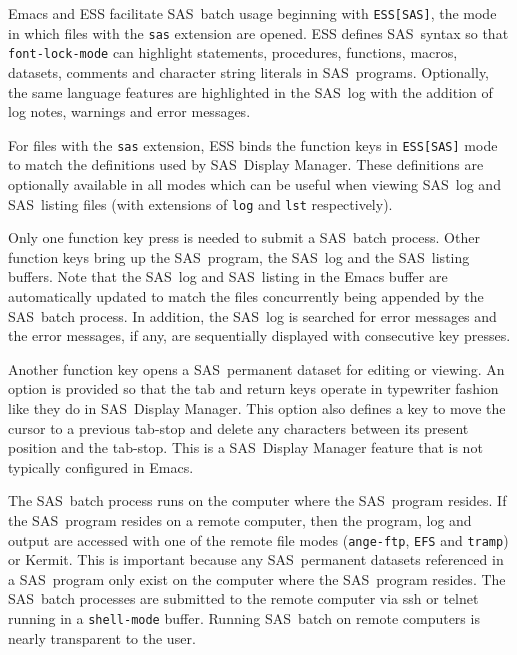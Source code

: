 \documentclass{article}
\newcommand*{\SAS}{\textsc{SAS}}
\newcommand{\stexttt}[1]{{\small\texttt{#1}}}
\newenvironment{Comment}{\begin{quote}\small\itshape }{\end{quote}}
\begin{document}
Emacs and ESS facilitate \SAS\ batch usage beginning with
\stexttt{ESS[SAS]}, the mode in which files with the \stexttt{sas}
extension are opened.  ESS defines \SAS\ syntax so that
\stexttt{font-lock-mode} can highlight statements, procedures,
functions, macros, datasets, comments and character string literals in
\SAS\ programs.  Optionally, the same language features are
highlighted in the \SAS\ log with the addition of log notes, warnings
and error messages.

For files with the \stexttt{sas} extension, ESS binds the function
keys in \stexttt{ESS[SAS]} mode to match the definitions used by \SAS\ 
Display Manager.  These definitions are optionally available in all
modes which can be useful when viewing \SAS\ log and \SAS\ listing
files (with extensions of \stexttt{log} and \stexttt{lst}
respectively).

Only one function key press is needed to submit a \SAS\ batch process.
Other function keys bring up the \SAS\ program, the \SAS\ log and the
\SAS\ listing buffers.  Note that %
the \SAS\ log and \SAS\ listing in the Emacs buffer are automatically
updated to match the files concurrently being appended by the \SAS\ 
batch process.  In addition, the \SAS\ log is searched for error
messages and the error messages, if any, are sequentially displayed
with consecutive key presses.

Another function key opens a \SAS\ permanent dataset for editing or
viewing.  An option is provided so that the tab and return keys
operate in typewriter fashion like they do in \SAS\ Display Manager.
This option also defines a key to move the cursor to a previous
tab-stop and delete any characters between its present position and
the tab-stop.  This is a \SAS\ Display Manager feature that is not
typically configured in Emacs.

The \SAS\ batch process runs on the computer where the \SAS\ program
resides.  If the \SAS\ program resides on a remote computer, then the
program, log and output are accessed with one of the remote file modes
(\stexttt{ange-ftp}, \stexttt{EFS} and \stexttt{tramp}) or Kermit.
This is important because any \SAS\ permanent datasets referenced in a
\SAS\ program only exist on the computer where the \SAS\ program
resides.  The \SAS\ batch processes are submitted to the remote
computer via ssh or telnet running in a \stexttt{shell-mode} buffer.
Running \SAS\ batch on remote computers is nearly transparent to the user.

\end{document}
